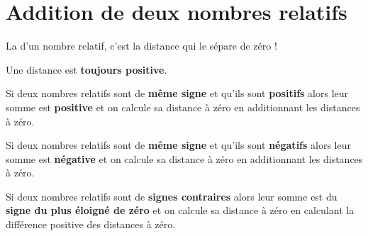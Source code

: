 \section{Addition de deux nombres relatifs}
\begin{definition}
  La  d'un nombre relatif, c’est la distance qui le sépare de zéro !

  Une distance est \textbf{toujours positive}.
\end{definition}

\begin{propriete}[(admise)]
  Si deux nombres relatifs sont de \textbf{même signe} et qu’ils sont \textbf{positifs} 
  alors leur somme est \textbf{positive} et on calcule sa distance à zéro en additionnant les distances à zéro.
\end{propriete}

\begin{propriete}[(admise)]
  Si deux nombres relatifs sont de \textbf{même signe} et qu’ils sont \textbf{négatifs}
  alors leur somme est \textbf{négative} et on calcule sa distance à zéro en additionnant les distances à zéro.
\end{propriete}

\begin{propriete}[(admise)]
  Si deux nombres relatifs sont de \textbf{signes contraires}
  alors leur somme est du \textbf{signe du plus éloigné de zéro} et on calcule sa distance à zéro en calculant la différence positive des distances à zéro.
\end{propriete}


